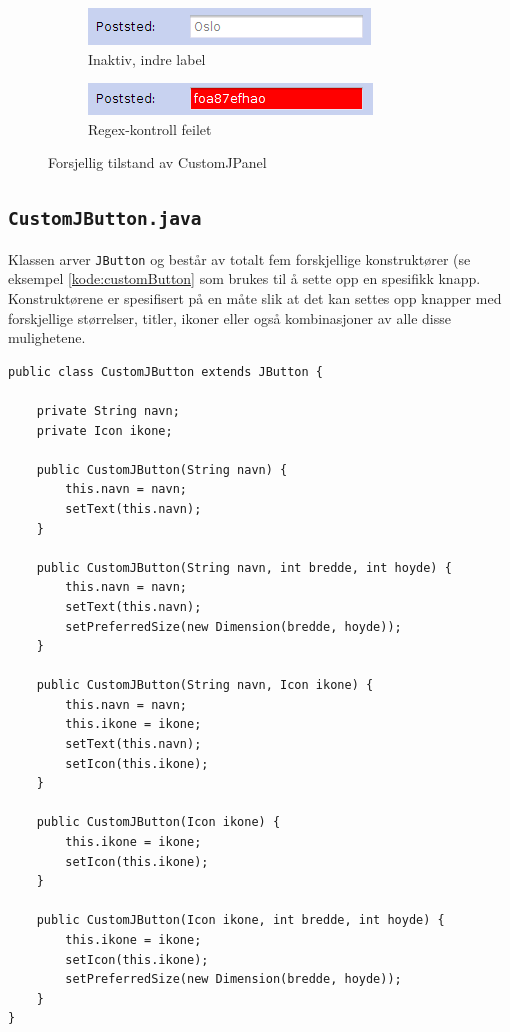 \begin{figure}[ht!]
\centering
\begin{subfigure}[b]{1\textwidth}
\centering

\includegraphics[scale=0.7]{./img/produktdokumentasjon/swing_componenter/1.png}
\caption{Inaktiv, indre label}
\label{fig:custom1}
\end{subfigure}
\quad

\begin{subfigure}[b]{1\textwidth}
\centering
\includegraphics[scale=0.7]{./img/produktdokumentasjon/swing_componenter/2.png}
\caption{Regex-kontroll feilet}
\label{fig:custom2}
\end{subfigure}
\quad

\caption{Forsjellig tilstand av CustomJPanel}\label{fig:customjpane}
\end{figure}



\subsection{\texttt{CustomJButton.java}}
Klassen arver \texttt{JButton} og består av totalt fem forskjellige konstruktører (se eksempel \ref{kode:customButton} som brukes til å sette opp en spesifikk knapp. Konstruktørene er spesifisert på en måte slik at det kan settes opp knapper med forskjellige størrelser, titler, ikoner eller også kombinasjoner av alle disse mulighetene. 

\begin{lstlisting}[caption=De forskjellige konstruktørene i \texttt{CustomJButton}. ,label=kode:customButton]
public class CustomJButton extends JButton {

    private String navn;
    private Icon ikone;

    public CustomJButton(String navn) {
        this.navn = navn;
        setText(this.navn);
    }

    public CustomJButton(String navn, int bredde, int hoyde) {
        this.navn = navn;
        setText(this.navn);
        setPreferredSize(new Dimension(bredde, hoyde));
    }

    public CustomJButton(String navn, Icon ikone) {
        this.navn = navn;
        this.ikone = ikone;
        setText(this.navn);
        setIcon(this.ikone);
    }

    public CustomJButton(Icon ikone) {
        this.ikone = ikone;
        setIcon(this.ikone);
    }

    public CustomJButton(Icon ikone, int bredde, int hoyde) {
        this.ikone = ikone;
        setIcon(this.ikone);
        setPreferredSize(new Dimension(bredde, hoyde));
    }
}
\end{lstlisting}






